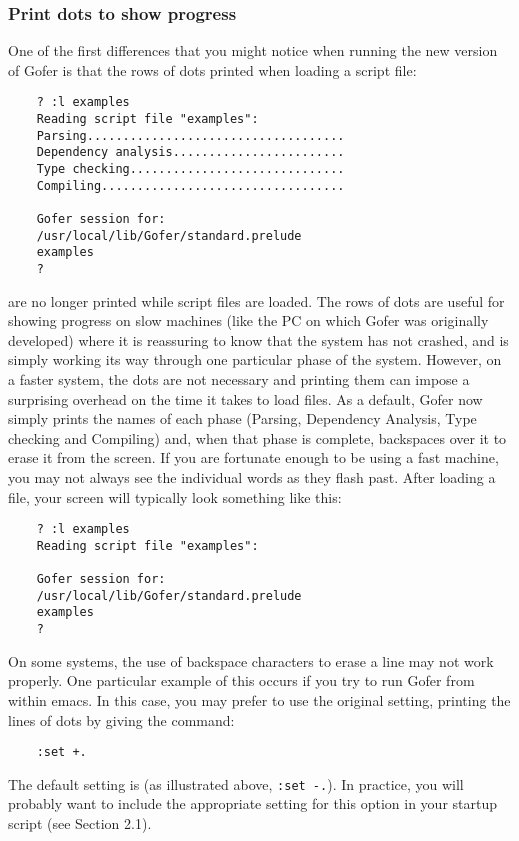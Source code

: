 \subsubsection{Print dots to show progress}
One of the first differences that you might notice when running the
new version of Gofer is that the rows of dots printed when loading a
script file:
\begin{verbatim}
    ? :l examples
    Reading script file "examples":
    Parsing....................................
    Dependency analysis........................
    Type checking..............................
    Compiling..................................

    Gofer session for:
    /usr/local/lib/Gofer/standard.prelude
    examples
    ?
\end{verbatim}
are no longer printed while script files are loaded.  The rows of dots
are useful for showing progress on slow machines (like the PC on which
Gofer was originally developed) where it is reassuring to know that the
system has not crashed, and is simply working its way through one
particular phase of the system.  However, on a faster system, the dots
are not necessary and printing them can impose a surprising overhead on
the time it takes to load files.  As a default, Gofer now simply prints
the names of each phase (Parsing, Dependency Analysis, Type checking
and Compiling) and, when that phase is complete, backspaces over it to
erase it from the screen.  If you are fortunate enough to be using a
fast machine, you may not always see the individual words as they flash
past.  After loading a file, your screen will typically look something
like this:
\begin{verbatim}
    ? :l examples
    Reading script file "examples":
                   
    Gofer session for:
    /usr/local/lib/Gofer/standard.prelude
    examples
    ?
\end{verbatim}
On some systems, the use of backspace characters to erase a line may
not work properly.  One particular example of this occurs if you try to
run Gofer from within emacs.  In this case, you may prefer to use the
original setting, printing the lines of dots by giving the command:
\begin{verbatim}
    :set +.
\end{verbatim}
The default setting is (as illustrated above, \verb":set -.").  In practice,
you will probably want to include the appropriate setting for this
option in your startup script (see Section 2.1).


